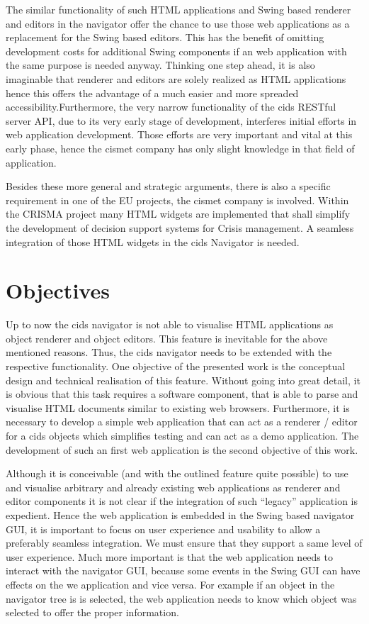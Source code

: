 The similar functionality of such HTML applications and Swing based renderer and editors in the navigator offer the chance to use those web applications as a replacement for the Swing based editors.
This has the benefit of omitting development costs for additional Swing components if an web application with the same purpose is needed anyway.
Thinking one step ahead, it is also imaginable that renderer and editors are solely realized as HTML applications hence this offers the advantage of a much easier and more spreaded accessibility.Furthermore, the very narrow functionality of the cids RESTful server API, due to its very early stage of development, interferes initial efforts in web application development.
Those efforts are very important and vital at this early phase, hence the cismet company has only slight knowledge in that field of application.

 
Besides these more general and strategic arguments, there is also a specific requirement in one of the EU projects, the cismet company is involved.
Within the CRISMA project many HTML widgets are implemented that shall simplify the development of decision support systems for Crisis management.
A seamless integration of those HTML widgets in the cids Navigator is needed.


\section{Objectives}\label{chap:intro-objectives}

Up to now the cids navigator is not able to visualise HTML applications as object renderer and object editors.
This feature is inevitable for the above mentioned reasons.
Thus, the cids navigator needs to be extended with the respective functionality.
One objective of the presented work is the conceptual design and technical realisation of this feature.
Without going into great detail, it is obvious that this task requires a software component, that is able to parse and visualise HTML documents similar to existing web browsers.
Furthermore, it is necessary to develop a simple web application that can act as a renderer / editor for a cids objects which simplifies testing and can act as a demo application.
The development of such an first web application is the second objective of this work.

Although it is conceivable (and with the outlined feature quite possible) to use and visualise arbitrary and already existing web applications as renderer and editor components it is not clear if the integration of such \enquote{legacy} application is expedient.
Hence the web application is embedded in the Swing based navigator GUI, it is important to focus on user experience and usability to allow a preferably seamless integration.
We must ensure that they support a same level of user experience.
Much more important is that the web application needs to interact with the navigator GUI, because some events in the Swing GUI can have effects on the we application and vice versa.
For example if an object in the navigator tree is is selected, the web application needs to know which object was selected to offer the proper information.


